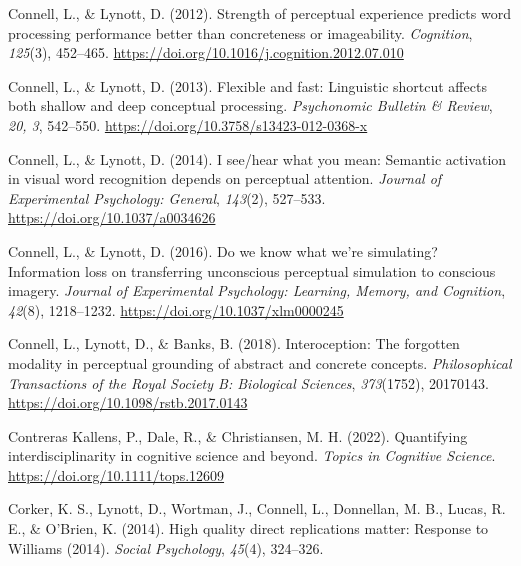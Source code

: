 \documentclass[
  12pt,
  man,floatsintext]{apa7}
\newlength{\cslhangindent}
\newlength{\cslentryspacingunit} %
\newenvironment{CSLReferences}[2] %
 {%
  \setlength{\parindent}{0pt}
  \ifodd #1
  \let\oldpar\par
  \def\par{\hangindent=\cslhangindent\oldpar}
  \fi
  \setlength{\parskip}{#2\cslentryspacingunit}
 }%
 {}
\begin{document}
\begin{CSLReferences}{1}{0}
\leavevmode{}%
Connell, L., \& Lynott, D. (2012). Strength of perceptual experience predicts word processing performance better than concreteness or imageability. \emph{Cognition}, \emph{125}(3), 452--465. \url{https://doi.org/10.1016/j.cognition.2012.07.010}

\leavevmode{}%
Connell, L., \& Lynott, D. (2013). Flexible and fast: {Linguistic} shortcut affects both shallow and deep conceptual processing. \emph{Psychonomic Bulletin \& Review}, \emph{20, 3}, 542--550. \url{https://doi.org/10.3758/s13423-012-0368-x}

\leavevmode{}%
Connell, L., \& Lynott, D. (2014). I see/hear what you mean: {Semantic} activation in visual word recognition depends on perceptual attention. \emph{Journal of Experimental Psychology: General}, \emph{143}(2), 527--533. \url{https://doi.org/10.1037/a0034626}

\leavevmode{}%
Connell, L., \& Lynott, D. (2016). Do we know what we're simulating? {Information} loss on transferring unconscious perceptual simulation to conscious imagery. \emph{Journal of Experimental Psychology: Learning, Memory, and Cognition}, \emph{42}(8), 1218--1232. \url{https://doi.org/10.1037/xlm0000245}

\leavevmode{}%
Connell, L., Lynott, D., \& Banks, B. (2018). Interoception: The forgotten modality in perceptual grounding of abstract and concrete concepts. \emph{Philosophical Transactions of the Royal Society B: Biological Sciences}, \emph{373}(1752), 20170143. \url{https://doi.org/10.1098/rstb.2017.0143}

\leavevmode{}%
Contreras Kallens, P., Dale, R., \& Christiansen, M. H. (2022). Quantifying interdisciplinarity in cognitive science and beyond. \emph{Topics in Cognitive Science}. \url{https://doi.org/10.1111/tops.12609}

\leavevmode{}%
Corker, K. S., Lynott, D., Wortman, J., Connell, L., Donnellan, M. B., Lucas, R. E., \& O'Brien, K. (2014). High quality direct replications matter: {Response} to {Williams} (2014). \emph{Social Psychology}, \emph{45}(4), 324--326.


\end{CSLReferences}
\end{document}
